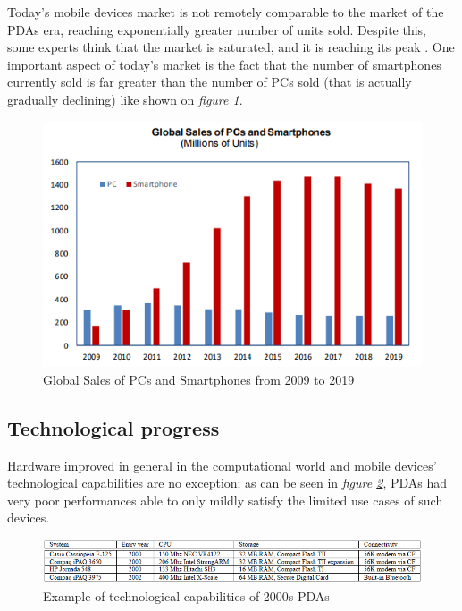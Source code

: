 Today's mobile devices market is not remotely comparable to the market of the PDAs era, reaching exponentially greater number of units sold. Despite this, some experts think that the market is saturated, and it is reaching its peak \cite{smartphones_sales}. One important aspect of today's market is the fact that the number of smartphones currently sold is far greater than the number of PCs sold (that is actually gradually declining) like shown on \textit{figure \ref{fig:global_sales_of_pcs_and_smartphones}}.

\begin{figure}[!ht]
    \centering
    \includegraphics[scale=0.9]{document/chapters/chapter_1/images/global_sales_of_pcs_and_smartphones.png}
    \caption{Global Sales of PCs and Smartphones from 2009 to 2019 \cite{smartphones_sales}}
    \label{fig:global_sales_of_pcs_and_smartphones}
\end{figure}

\subsection{Technological progress}
Hardware improved in general in the computational world and mobile devices' technological capabilities are no exception; as can be seen in \textit{figure \ref{fig:pda_capabilities}}, PDAs had very poor performances able to only mildly satisfy the limited use cases of such devices. 

\begin{figure}[!ht]
    \centering
    \includegraphics[scale=0.75]{document/chapters/chapter_1/images/pda_capabilities.png}
    \caption{Example of technological capabilities of 2000s PDAs \cite{integrating_mobile_devices_into_grid}}
    \label{fig:pda_capabilities}
\end{figure}

